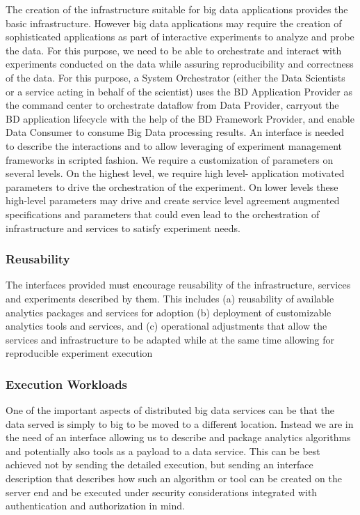 \documentclass[10pt]{article}
\begin{document}
The creation of the infrastructure suitable for big data applications provides the basic infrastructure. However big data applications may require the creation of sophisticated applications as part of interactive experiments to analyze and probe the data. For this purpose, we need to be able to orchestrate and interact with experiments conducted on the data while assuring reproducibility and correctness of the data. For this purpose, a System Orchestrator (either the Data Scientists or a service acting in behalf of the scientist) uses the BD Application Provider as the command center to orchestrate dataflow from Data Provider, carryout the BD application lifecycle with the help of the BD Framework Provider, and enable Data Consumer to consume Big Data processing results. An interface is needed to describe the interactions and to allow leveraging of experiment management frameworks in scripted fashion. We require a customization of parameters on several levels. On the highest level, we require high level- application motivated parameters to drive the orchestration of the experiment. On lower levels these high-level parameters may drive and create service level agreement augmented specifications and parameters that could even lead to the orchestration of infrastructure and services to satisfy experiment needs.

\subsubsection{Reusability}

The interfaces provided must encourage reusability of the infrastructure, services and experiments described by them. This includes (a) reusability of available analytics packages and services for adoption (b) deployment of customizable analytics tools and services, and (c) operational adjustments that allow the services and infrastructure to be adapted while at the same time allowing for reproducible experiment execution

\subsubsection{Execution Workloads}

One of the important aspects of distributed big data services can be that the data served is simply to big to be moved to a different location. Instead we are in the need of an interface allowing us to describe and package analytics algorithms and potentially also tools as a payload to a data service. This can be best achieved not by sending the detailed execution, but sending an interface description that describes how such an algorithm or tool can be created on the server end and be executed under security considerations integrated with authentication and authorization in mind.
\end{document}
